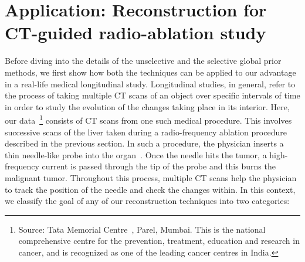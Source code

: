 \documentclass[journal]{IEEEtran}
\begin{document}
\section{Application: Reconstruction for CT-guided radio-ablation study}
\label{sec:tmh}
Before diving into the details of the unselective and the selective global prior methods, we first show how both the techniques can be applied to our advantage in a real-life medical longitudinal study. Longitudinal studies, in general, refer to the process of taking multiple CT scans of an object over specific intervals of time in order to study the evolution of the changes taking place in its interior. Here, our data~\footnote{Source: Tata Memorial Centre~\cite{tmh}, Parel, Mumbai.  This is the national comprehensive centre for the prevention, treatment, education and research in cancer, and is recognized as one of the leading cancer centres in India.} consists of CT scans from one such medical procedure. This involves successive scans of the liver taken during a radio-frequency ablation procedure described in the previous section. In such a procedure, the physician inserts a thin needle-like probe into the organ~\cite{rfa}. Once the needle hits the tumor, a high-frequency current is passed through the tip of the probe and this burns the malignant tumor. Throughout this process, multiple CT scans help the physician to track the position of the needle and check the changes within. In this context, we classify the goal of any of our reconstruction techniques into two categories: 
\end{document}
